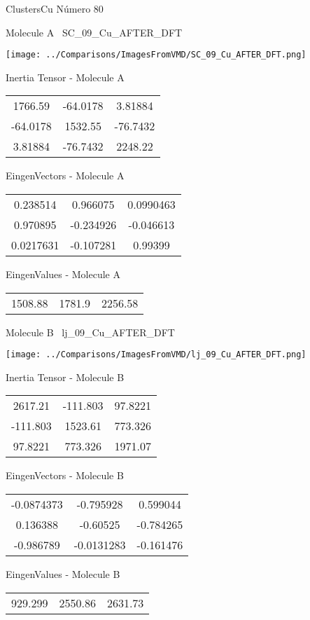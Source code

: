 \vtab[-3cm]
\begin{center}
{\large ClustersCu \tab Número 80}
\end{center}
\begin{multicols}{2}
\begin{center}

Molecule A \
SC\_09\_Cu\_AFTER\_DFT

\texttt{[image: ../Comparisons/ImagesFromVMD/SC\_09\_Cu\_AFTER\_DFT.png]}

Inertia Tensor - Molecule A \\
\begin{tabular}{|c c c|}
1766.59	 & 	-64.0178	 & 	3.81884	 \\
-64.0178	 & 	1532.55	 & 	-76.7432	 \\
3.81884	 & 	-76.7432	 & 	2248.22
\end{tabular}

\vtab
 EingenVectors - Molecule A     \\
\begin{tabular}{|c c c|}
0.238514	 & 	0.966075	 & 	0.0990463	 \\
0.970895	 & 	-0.234926	 & 	-0.046613	 \\
0.0217631	 & 	-0.107281	 & 	0.99399
\end{tabular}

\vtab
 EingenValues - Molecule A     \\
\begin{tabular}{|c c c|}
1508.88	 & 	1781.9	 & 	2256.58	 \\
\end{tabular}
\columnbreak

Molecule B \
lj\_09\_Cu\_AFTER\_DFT

\texttt{[image: ../Comparisons/ImagesFromVMD/lj\_09\_Cu\_AFTER\_DFT.png]}

Inertia Tensor - Molecule B \\
\begin{tabular}{|c c c|}
2617.21	 & 	-111.803	 & 	97.8221	 \\
-111.803	 & 	1523.61	 & 	773.326	 \\
97.8221	 & 	773.326	 & 	1971.07
\end{tabular}

\vtab
 EingenVectors - Molecule B     \\
\begin{tabular}{|c c c|}
-0.0874373	 & 	-0.795928	 & 	0.599044	 \\
0.136388	 & 	-0.60525	 & 	-0.784265	 \\
-0.986789	 & 	-0.0131283	 & 	-0.161476
\end{tabular}

\vtab
 EingenValues - Molecule B     \\
\begin{tabular}{|c c c|}
929.299	 & 	2550.86	 & 	2631.73	 \\
\end{tabular}

\end{center}
\end{multicols}

